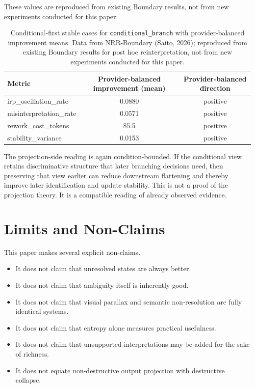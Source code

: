 \documentclass[11pt,a4paper]{article}
\begin{document}
These values are reproduced from existing Boundary results, not from new experiments conducted for this paper.

\begin{table}[h]
\centering
\small
\begin{tabular}{p{4.3cm}cc}
\toprule
Metric & Provider-balanced improvement (mean) & Provider-balanced direction \\
\midrule
irp\_oscillation\_rate & 0.0880 & positive \\
misinterpretation\_rate & 0.0571 & positive \\
rework\_cost\_tokens & 85.5 & positive \\
stability\_variance & 0.0153 & positive \\
\bottomrule
\end{tabular}
\caption{Conditional-first stable cases for \texttt{conditional\_branch} with provider-balanced improvement means. Data from NRR-Boundary (Saito, 2026); reproduced from existing Boundary results for post hoc reinterpretation, not from new experiments conducted for this paper.}
\label{tab:boundary_conditional_first}
\end{table}

The projection-side reading is again condition-bounded. If the conditional view retains discriminative structure that later branching decisions need, then preserving that view earlier can reduce downstream flattening and thereby improve later identification and update stability. This is not a proof of the projection theory. It is a compatible reading of already observed evidence.

\section{Limits and Non-Claims}
\label{sec:limits}

This paper makes several explicit non-claims.

\begin{itemize}
  \item It does not claim that unresolved states are always better.
  \item It does not claim that ambiguity itself is inherently good.
  \item It does not claim that visual parallax and semantic non-resolution are fully identical systems.
  \item It does not claim that entropy alone measures practical usefulness.
  \item It does not claim that unsupported interpretations may be added for the sake of richness.
  \item It does not equate non-destructive output projection with destructive collapse.
\end{itemize}
\end{document}
